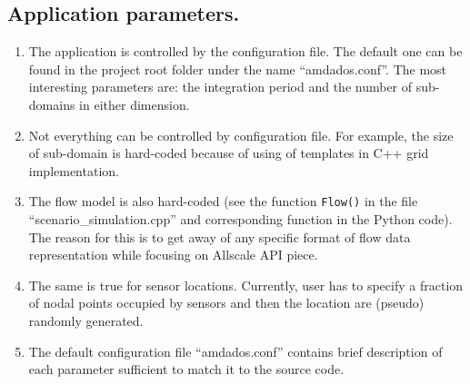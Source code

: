 \documentclass[]{article}
\begin{document}
\subsection{Application parameters.}
\begin{enumerate}
\item The application is controlled by the configuration file. The default one can be found in the project root folder under the name ``amdados.conf''. The most interesting parameters are: the integration period and the number of sub-domains in either dimension. 
\item Not everything can be controlled by configuration file. For example, the size of sub-domain is hard-coded because of using of templates in C++ grid implementation.
\item The flow model is also hard-coded (see the function \texttt{Flow()} in the file ``scenario\_simulation.cpp'' and corresponding function in the Python code). The reason for this is to get away of any specific format of flow data representation while focusing on Allscale API piece.
\item The same is true for sensor locations. Currently, user has to specify a fraction of nodal points occupied by sensors and then the location are (pseudo) randomly generated.
\item The default configuration file ``amdados.conf'' contains brief description of each parameter sufficient to match it to the source code.
\end{enumerate}
\end{document}

